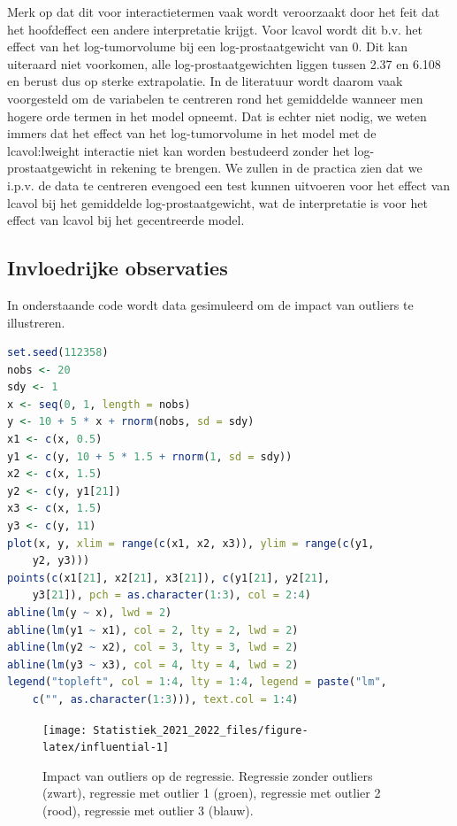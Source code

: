 \documentclass[
  12pt,dutch,coursenotes]{book}
\theoremstyle{definition}
\theoremstyle{definition}
\theoremstyle{definition}
\theoremstyle{definition}
\theoremstyle{remark}
\begin{document}
Merk op dat dit voor interactietermen vaak wordt veroorzaakt door het feit dat het hoofdeffect een andere interpretatie krijgt. Voor lcavol wordt dit b.v. het effect van het log-tumorvolume bij een log-prostaatgewicht van 0. Dit kan uiteraard niet voorkomen, alle log-prostaatgewichten liggen tussen 2.37 en 6.108 en berust dus op sterke extrapolatie. In de literatuur wordt daarom vaak voorgesteld om de variabelen te centreren rond het gemiddelde wanneer men hogere orde termen in het model opneemt. Dat is echter niet nodig, we weten immers dat het effect van het log-tumorvolume in het model met de lcavol:lweight interactie niet kan worden bestudeerd zonder het log-prostaatgewicht in rekening te brengen.
We zullen in de practica zien dat we i.p.v. de data te centreren evengoed een test kunnen uitvoeren voor het effect van lcavol bij het gemiddelde log-prostaatgewicht, wat de interpretatie is voor het effect van lcavol bij het gecentreerde model.

\hypertarget{invloedrijke-observaties}{%
\subsection{Invloedrijke observaties}\label{invloedrijke-observaties}}

In onderstaande code wordt data gesimuleerd om de impact van outliers te illustreren.

\begin{lstlisting}[language=R]
set.seed(112358)
nobs <- 20
sdy <- 1
x <- seq(0, 1, length = nobs)
y <- 10 + 5 * x + rnorm(nobs, sd = sdy)
x1 <- c(x, 0.5)
y1 <- c(y, 10 + 5 * 1.5 + rnorm(1, sd = sdy))
x2 <- c(x, 1.5)
y2 <- c(y, y1[21])
x3 <- c(x, 1.5)
y3 <- c(y, 11)
plot(x, y, xlim = range(c(x1, x2, x3)), ylim = range(c(y1,
    y2, y3)))
points(c(x1[21], x2[21], x3[21]), c(y1[21], y2[21],
    y3[21]), pch = as.character(1:3), col = 2:4)
abline(lm(y ~ x), lwd = 2)
abline(lm(y1 ~ x1), col = 2, lty = 2, lwd = 2)
abline(lm(y2 ~ x2), col = 3, lty = 3, lwd = 2)
abline(lm(y3 ~ x3), col = 4, lty = 4, lwd = 2)
legend("topleft", col = 1:4, lty = 1:4, legend = paste("lm",
    c("", as.character(1:3))), text.col = 1:4)
\end{lstlisting}

\begin{figure}

{\centering \texttt{[image: Statistiek\_2021\_2022\_files/figure-latex/influential-1]} 

}

\caption{Impact van outliers op de regressie. Regressie zonder outliers (zwart), regressie met outlier 1 (groen), regressie met outlier 2 (rood), regressie met outlier 3 (blauw).}\label{fig:influential}
\end{figure}
\end{document}
